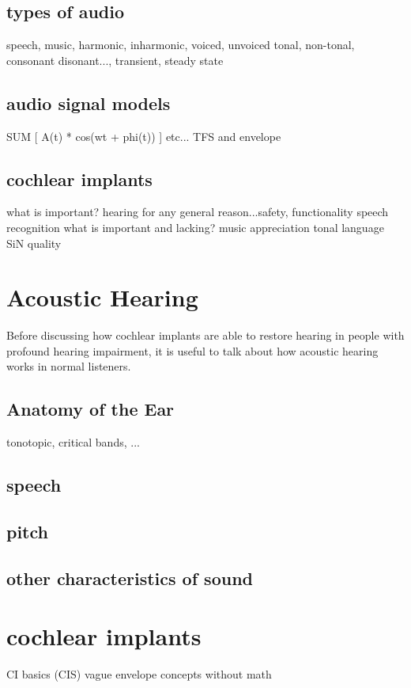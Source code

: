 \documentclass [11pt, proquest] {uwthesis}[2015/03/03]
\begin{document}
	\subsection{types of audio}
	speech, music, harmonic, inharmonic, voiced, unvoiced
	tonal, non-tonal, consonant disonant..., transient, steady state

	\subsection{audio signal models}
	SUM [ A(t) * cos(wt + phi(t)) ]
	etc...
	TFS and envelope
	
	\subsection{cochlear implants}
	what is important?
		hearing for any general reason...safety, functionality
		speech recognition
	what is important and lacking?
		music appreciation
		tonal language
		SiN
		quality

\fi


\section{Acoustic Hearing}

Before discussing how cochlear implants are able to restore hearing in people with profound hearing impairment, it is useful to talk about how acoustic hearing works in normal listeners.

\subsection{Anatomy of the Ear}

tonotopic, critical bands, ...

\subsection{speech}

\subsection{pitch}

\subsection{other characteristics of sound}

\section{cochlear implants}
CI basics (CIS)
vague envelope concepts without math
\end{document}
